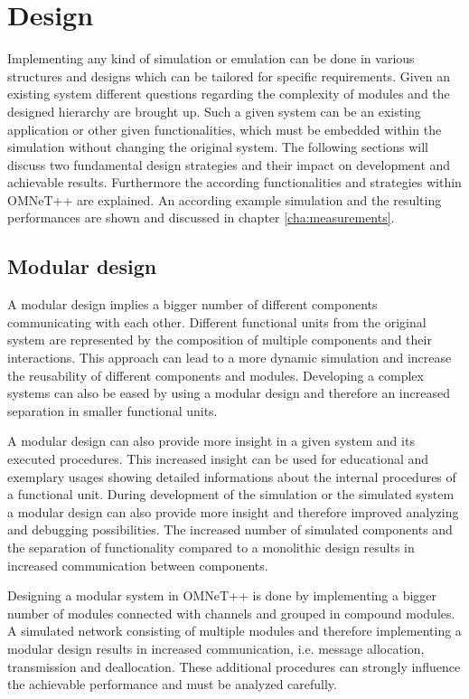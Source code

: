 \chapter{Design}
\label{cha:design}
Implementing any kind of simulation or emulation can be done in various structures and designs which can be tailored for specific requirements.
Given an existing system different questions regarding the complexity of modules and the designed hierarchy are brought up.
Such a given system can be an existing application or other given functionalities, which must be embedded within the simulation without changing the original system.
The following sections will discuss two fundamental design strategies and their impact on development and achievable results.
Furthermore the according functionalities and strategies within OMNeT++ are explained.
An according example simulation and the resulting performances are shown and discussed in chapter \ref{cha:measurements}.

\section{Modular design}
\label{sec:design_modular}
A modular design implies a bigger number of different components communicating with each other.
Different functional units from the original system are represented by the composition of multiple components and their interactions.
This approach can lead to a more dynamic simulation and increase the reusability of different components and modules.
Developing a complex systems can also be eased by using a modular design and therefore an increased separation in smaller functional units.

A modular design can also provide more insight in a given system and its executed procedures.
This increased insight can be used for educational and exemplary usages showing detailed informations about the internal procedures of a functional unit.
During development of the simulation or the simulated system a modular design can also provide more insight and therefore improved analyzing and debugging possibilities.
The increased number of simulated components and the separation of functionality compared to a monolithic design results in increased communication between components.

Designing a modular system in OMNeT++ is done by implementing a bigger number of modules connected with channels and grouped in compound modules.
A simulated network consisting of multiple modules and therefore implementing a modular design results in increased communication, i.e. message allocation, transmission and deallocation.
These additional procedures can strongly influence the achievable performance and must be analyzed carefully.

